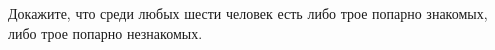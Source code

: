 Докажите, что среди любых шести человек есть либо трое попарно знакомых, либо трое попарно незнакомых.